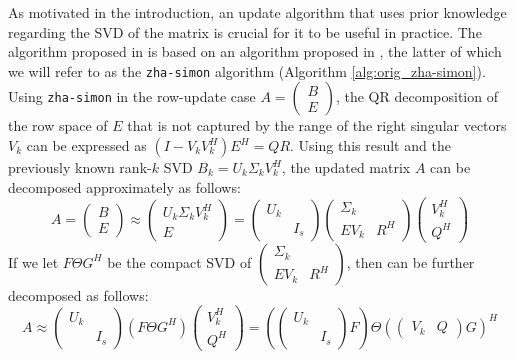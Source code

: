 As motivated in the introduction, an update algorithm that uses prior knowledge regarding the SVD of the matrix is crucial for it to be useful in practice.
The algorithm proposed in \cite{Kalantzis2021} is based on an algorithm proposed in \cite{Zha1999}, the latter of which we will refer to as the \verb+zha-simon+ algorithm (Algorithm \ref{alg:orig_zha-simon}).
Using \verb+zha-simon+ in the row-update case $A=\begin{pmatrix} B \\ E \end{pmatrix}$, the QR decomposition of the row space of $E$ that is not captured by the range of the right singular vectors $V_k$ can be expressed as $(I-V_k V_k^H)E^H = QR$.
Using this result and the previously known rank-$k$ SVD $B_k=U_k \Sigma_k V_k^H$, the updated matrix $A$ can be decomposed approximately as follows:
\begin{equation}
  A = \begin{pmatrix} B \\ E \end{pmatrix} \approx
  \begin{pmatrix} U_k \Sigma_k V_k^H \\ E \end{pmatrix} = 
  \begin{pmatrix} U_k & \\ & I_s \end{pmatrix} \begin{pmatrix} \Sigma_k & \\ EV_k & R^H \end{pmatrix} \begin{pmatrix} V_k^H \\ Q^H \end{pmatrix}
  \label{eq:zhasimon_partial}
\end{equation}
If we let $F\Theta G^H$ be the compact SVD of $\begin{pmatrix} \Sigma_k & \\ EV_k & R^H \end{pmatrix}$, then  can be further decomposed as follows:
\begin{equation}
  A \approx 
  \begin{pmatrix} U_k & \\ & I_s \end{pmatrix} \left(F\Theta G^H\right) \begin{pmatrix} V_k^H \\ Q^H \end{pmatrix}
  = \left( \begin{pmatrix} U_k & \\ & I_s \end{pmatrix} F \right) \Theta \left( \begin{pmatrix} V_k & Q \end{pmatrix} G \right) ^H
  \label{eq:zhasimon_full}
\end{equation}
